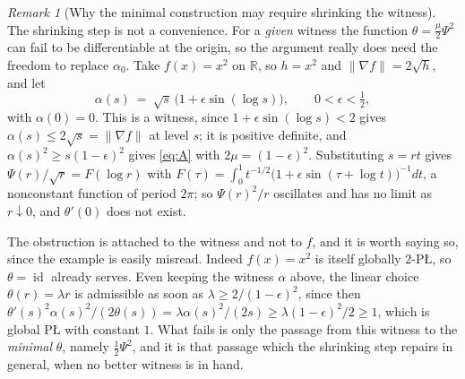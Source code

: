 \documentclass[11pt]{article}
\theoremstyle{plain}
\theoremstyle{definition}
\theoremstyle{remark}
\newtheorem{rem}[thm]{Remark}
\newcommand{\R}{\mathbb{R}}
\begin{document}
\begin{rem}[Why the minimal construction may require shrinking the witness]\label{rem:shrink}
The shrinking step is not a convenience. For a \emph{given} witness the function
$\theta=\tfrac\mu2\Psi^2$ can fail to be differentiable at the origin, so the
argument really does need the freedom to replace $\alpha_0$. Take $f(x)=x^2$ on
$\R$, so $h=x^2$ and $\|\nabla f\|=2\sqrt h$, and let
\[
  \alpha(s) \ =\ \sqrt s\,\bigl(1+\epsilon\sin(\log s)\bigr) ,
  \qquad 0<\epsilon<\tfrac12 ,
\]
with $\alpha(0)=0$. This is a witness, since $1+\epsilon\sin(\log s)<2$ gives
$\alpha(s)\le2\sqrt s=\|\nabla f\|$ at level $s$; it is positive definite, and
$\alpha(s)^2\ge s(1-\epsilon)^2$ gives \eqref{eq:A} with $2\mu=(1-\epsilon)^2$.
Substituting $s=rt$ gives
$\Psi(r)/\sqrt r = F(\log r)$ with
$F(\tau) = \int_0^1 t^{-1/2}\bigl(1+\epsilon\sin(\tau+\log t)\bigr)^{-1}dt$, a
nonconstant function of period $2\pi$; so $\Psi(r)^2/r$ oscillates and has no
limit as $r\downarrow0$, and $\theta'(0)$ does not exist.

The obstruction is attached to the witness and not to $f$, and it is worth saying so,
since the example is easily misread. Indeed $f(x)=x^2$ is itself globally $2$-P\L{}, so
$\theta=\operatorname{id}$ already serves. Even keeping the witness $\alpha$ above, the
linear choice $\theta(r)=\lambda r$ is admissible as soon as
$\lambda\ge2/(1-\epsilon)^2$, since then
$\theta'(s)^2\alpha(s)^2/(2\theta(s)) = \lambda\alpha(s)^2/(2s)
\ge \lambda(1-\epsilon)^2/2 \ge 1$, which is global P\L{} with constant $1$. What
fails is only the passage from this witness to the \emph{minimal} $\theta$, namely
$\tfrac12\Psi^2$, and it is that passage which the shrinking step repairs in general,
when no better witness is in hand.
\end{rem}
\end{document}
